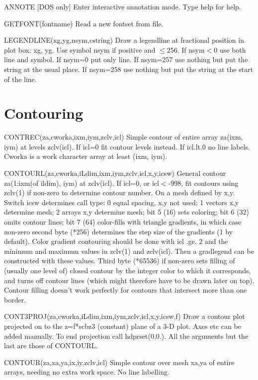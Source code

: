 \documentclass[12pt]{article}
\newif \iftth
\begin{document}
ANNOTE [DOS only] Enter interactive annotation mode. Type help for help.

GETFONT(fontname) Read a new fontset from file.

LEGENDLINE(xg,yg,nsym,cstring) Draw a legendline at fractional
position in plot box: xg, yg.  Use symbol nsym if positive and $\le$256.
If nsym$<$0 use both line and symbol. If nsym=0 put only line.  
If nsym=257 use nothing but put the string at the usual place.
If nsym=258 use nothing but put the string at the start of the line.

\section{Contouring}

\iftth \special{html:<a href="contest.f"><img align="right" src="contest.png"></a>}\fi

CONTREC(za,cworka,ixm,iym,zclv,icl) Simple contour of entire array za(ixm, iym)
at levels zclv(icl). If icl=0 fit contour levels instead. If icl.lt.0 no
line labels. Cworka is a work character array at least (ixm, iym).

CONTOURL(za,cworka,iLdim,ixm,iym,zclv,icl,x,y,icsw) General contour
za(1:ixm(of ildim), iym) at zclv(icl). If icl=0, or icl$<$-998, fit
contours using zclv(1) if non-zero to determine contour number. On a
mesh defined by x,y. Switch icsw determines call type: 0 equal
spacing, x,y not used; 1 vectors x,y determine mesh; 2 arrays x,y
determine mesh; bit 5 (16) sets coloring; bit 6 (32) omits contour
lines; bit 7 (64) color-fills with triangle gradients, in which case
non-zero second byte (*256) determines the step size of the gradients
(1 by default). Color gradient contouring should be done with icl
.ge. 2 and the minimum and maximum values in zclv(1) and
zclv(icl). Then a gradlegend can be constructed with these values.
Third byte (*65536) if non-zero sets filling of (usually one level of)
closed contour by the integer color to which it corresponds, and turns
off contour lines (which might therefore have to be drawn later on
top). Contour filling doesn't work perfectly for contours that
intersect more than one border.

CONT3PROJ(za,cworka,iLdim,ixm,iym,zclv,icl,x,y,icsw,f) Draw a contour
plot projected on to the z=f*scbz3 (constant) plane of a 3-D
plot. Axes etc can be added manually. To end projection call
hdprset(0,0.). All the arguments but the last are those of CONTOURL.

CONTOUR(za,xa,ya,ix,iy,zclv,icl) Simple contour over mesh xa,ya of entire
arrays, needing no extra work space. No line labelling.
\end{document}
